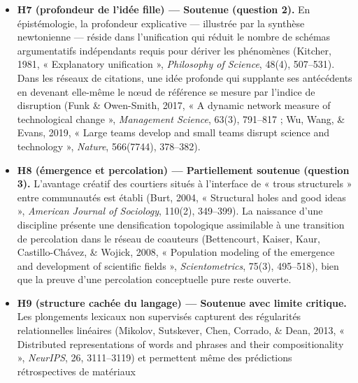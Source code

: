 \documentclass[a4paper,11pt]{article}
\begin{document}
\begin{itemize}
  \textbf{H6 (connexion et distinction) --- Soutenue (questions 1 et
  2).} Davis (1971, « That's interesting! », \emph{Philosophy of the
  Social Sciences}, 1, 309--344) montre qu'une thèse jugée intéressante
  soit unifie des phénomènes crus hétérogènes, soit dissocie des
  phénomènes crus identiques. Cognitivement, l'alignement structurel
  fait émerger des \emph{différences alignables} qui corrigent les
  fausses équivalences de surface (Gentner \& Markman, 1997, « Structure
  mapping in analogy and similarity », \emph{American Psychologist},
  52(1), 45--56).
\item
  \textbf{H7 (profondeur de l'idée fille) --- Soutenue (question 2).} En
  épistémologie, la profondeur explicative --- illustrée par la synthèse
  newtonienne --- réside dans l'unification qui réduit le nombre de
  schémas argumentatifs indépendants requis pour dériver les phénomènes
  (Kitcher, 1981, « Explanatory unification », \emph{Philosophy of
  Science}, 48(4), 507--531). Dans les réseaux de citations, une idée
  profonde qui supplante ses antécédents en devenant elle-même le nœud
  de référence se mesure par l'indice de disruption (Funk \& Owen-Smith,
  2017, « A dynamic network measure of technological change »,
  \emph{Management Science}, 63(3), 791--817 ; Wu, Wang, \& Evans, 2019,
  « Large teams develop and small teams disrupt science and technology
  », \emph{Nature}, 566(7744), 378--382).
\item
  \textbf{H8 (émergence et percolation) --- Partiellement soutenue
  (question 3).} L'avantage créatif des courtiers situés à l'interface
  de « trous structurels » entre communautés est établi (Burt, 2004, «
  Structural holes and good ideas », \emph{American Journal of
  Sociology}, 110(2), 349--399). La naissance d'une discipline présente
  une densification topologique assimilable à une transition de
  percolation dans le réseau de coauteurs (Bettencourt, Kaiser, Kaur,
  Castillo-Chávez, \& Wojick, 2008, « Population modeling of the
  emergence and development of scientific fields »,
  \emph{Scientometrics}, 75(3), 495--518), bien que la preuve d'une
  percolation conceptuelle pure reste ouverte.
\item
  \textbf{H9 (structure cachée du langage) --- Soutenue avec limite
  critique.} Les plongements lexicaux non supervisés capturent des
  régularités relationnelles linéaires (Mikolov, Sutskever, Chen,
  Corrado, \& Dean, 2013, « Distributed representations of words and
  phrases and their compositionality », \emph{NeurIPS}, 26, 3111--3119)
  et permettent même des prédictions rétrospectives de matériaux

\end{itemize}
\end{document}
